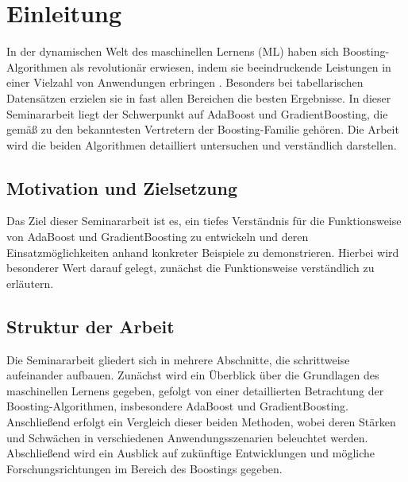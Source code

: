 \section{Einleitung}

In der dynamischen Welt des maschinellen Lernens (ML) haben sich Boosting-Algorithmen als revolutionär erwiesen, indem sie beeindruckende Leistungen in einer Vielzahl von Anwendungen erbringen \parencite[Kapitel 1.1.2]{SchapireFreund2012}. Besonders bei tabellarischen Datensätzen erzielen sie in fast allen Bereichen die besten Ergebnisse. 
\newline
In dieser Seminararbeit liegt der Schwerpunkt auf AdaBoost und GradientBoosting, die gemäß \textcite[S.~192]{Geron2018} zu den bekanntesten Vertretern der Boosting-Familie gehören. Die Arbeit wird die beiden Algorithmen detailliert untersuchen und verständlich darstellen.

\subsection{Motivation und Zielsetzung}

Das Ziel dieser Seminararbeit ist es, ein tiefes Verständnis für die Funktionsweise von AdaBoost und GradientBoosting zu entwickeln und deren Einsatzmöglichkeiten anhand konkreter Beispiele zu demonstrieren. Hierbei wird besonderer Wert darauf gelegt, zunächst die Funktionsweise verständlich zu erläutern.

\subsection{Struktur der Arbeit}

Die Seminararbeit gliedert sich in mehrere Abschnitte, die schrittweise aufeinander aufbauen. Zunächst wird ein Überblick über die Grundlagen des maschinellen Lernens gegeben, gefolgt von einer detaillierten Betrachtung der Boosting-Algorithmen, insbesondere AdaBoost und GradientBoosting. Anschließend erfolgt ein Vergleich dieser beiden Methoden, wobei deren Stärken und Schwächen in verschiedenen Anwendungsszenarien beleuchtet werden. Abschließend wird ein Ausblick auf zukünftige Entwicklungen und mögliche Forschungsrichtungen im Bereich des Boostings gegeben.



\cite[text]{Frochte2020}
\cite[text]{SchapireFreund2012}
\cite[text]{Geron2018}
\cite[text]{James2023}
\cite[text]{Hastie2009}
